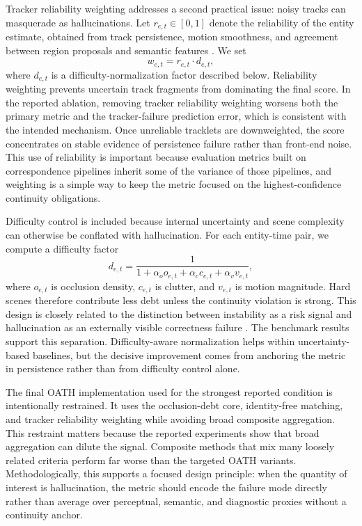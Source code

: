 \documentclass{article}
\begin{document}
Tracker reliability weighting addresses a second practical issue: noisy tracks can masquerade as hallucinations. Let \(r_{e,t}\in[0,1]\) denote the reliability of the entity estimate, obtained from track persistence, motion smoothness, and agreement between region proposals and semantic features \cite{bytetrack2022,deepsort2017,xmem2022}. We set
\[
w_{e,t}=r_{e,t}\cdot d_{e,t},
\]
where \(d_{e,t}\) is a difficulty-normalization factor described below. Reliability weighting prevents uncertain track fragments from dominating the final score. In the reported ablation, removing tracker reliability weighting worsens both the primary metric and the tracker-failure prediction error, which is consistent with the intended mechanism. Once unreliable tracklets are downweighted, the score concentrates on stable evidence of persistence failure rather than front-end noise. This use of reliability is important because evaluation metrics built on correspondence pipelines inherit some of the variance of those pipelines, and weighting is a simple way to keep the metric focused on the highest-confidence continuity obligations.

Difficulty control is included because internal uncertainty and scene complexity can otherwise be conflated with hallucination. For each entity-time pair, we compute a difficulty factor
\[
d_{e,t}=\frac{1}{1+\alpha_o o_{e,t}+\alpha_c c_{e,t}+\alpha_v v_{e,t}},
\]
where \(o_{e,t}\) is occlusion density, \(c_{e,t}\) is clutter, and \(v_{e,t}\) is motion magnitude. Hard scenes therefore contribute less debt unless the continuity violation is strong. This design is closely related to the distinction between instability as a risk signal and hallucination as an externally visible correctness failure \cite{diffusion_uncertainty2024,self_consistency2023}. The benchmark results support this separation. Difficulty-aware normalization helps within uncertainty-based baselines, but the decisive improvement comes from anchoring the metric in persistence rather than from difficulty control alone.

The final OATH implementation used for the strongest reported condition is intentionally restrained. It uses the occlusion-debt core, identity-free matching, and tracker reliability weighting while avoiding broad composite aggregation. This restraint matters because the reported experiments show that broad aggregation can dilute the signal. Composite methods that mix many loosely related criteria perform far worse than the targeted OATH variants. Methodologically, this supports a focused design principle: when the quantity of interest is hallucination, the metric should encode the failure mode directly rather than average over perceptual, semantic, and diagnostic proxies without a continuity anchor.
\end{document}
